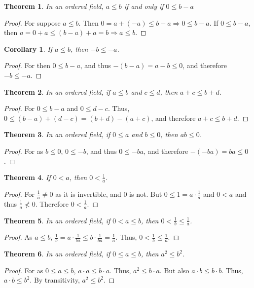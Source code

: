 \documentclass[oneside]{book}
\theoremstyle{mystyle}
\newtheorem{theorem}{Theorem}[section]
\newtheorem{corollary}{Corollary}[section]
\begin{document}
\begin{theorem}
In an ordered field, $a\leq b$ if and only if $0 \leq b-a$
\end{theorem}
\begin{proof}
For suppose $a\leq b$. Then $0=a+(-a)\leq b-a\Rightarrow 0 \leq b-a$. If $0\leq b-a$, then $a=0+a \leq (b-a)+a = b\Rightarrow a\leq b$.
\end{proof}

\begin{corollary}
If $a\leq b$, then $-b\leq -a$.
\end{corollary}
\begin{proof}
For then $0 \leq b-a$, and thus $-(b-a)=a-b\leq 0$, and therefore $-b \leq -a$.
\end{proof}

\begin{theorem}
In an ordered field, if $a\leq b$ and $c\leq d$, then $a+c \leq b+d$.
\end{theorem}
\begin{proof}
For $0\leq b-a$ and $0\leq d-c$. Thus, $0\leq (b-a)+(d-c)= (b+d)-(a+c)$, and therefore $a+c \leq b+d$.
\end{proof}

\begin{theorem}
In an ordered field, if $0\leq a$ and $b\leq 0$, then $ab\leq 0$.
\end{theorem}
\begin{proof}
For as $b\leq 0$, $0\leq -b$, and thus $0\leq -ba$, and therefore $-(-ba) = ba \leq 0$.
\end{proof}

\begin{theorem}
If $0< a$, then $0<\frac{1}{a}$.
\end{theorem}
\begin{proof}
For $\frac{1}{a}\ne 0$ as it is invertible, and $0$ is not. But $0\leq1=a\cdot \frac{1}{a}$ and $0<a$ and thus $\frac{1}{a} \not <0$. Therefore $0<\frac{1}{a}$.
\end{proof}

\begin{theorem}
In an ordered field, if $0<a\leq b$, then $0<\frac{1}{b}\leq\frac{1}{a}$.
\end{theorem}
\begin{proof}
As $a\leq b$, $\frac{1}{b}=a\cdot \frac{1}{ba} \leq b\cdot \frac{1}{ba}=\frac{1}{a}$. Thus, $0< \frac{1}{b}\leq \frac{1}{a}$.
\end{proof}

\begin{theorem}
In an ordered field, if $0 \leq a \leq b$, then $a^2 \leq b^2$.
\end{theorem}
\begin{proof}
For as $0\leq a \leq b$, $a\cdot a \leq b\cdot a$. Thus, $a^2 \leq b \cdot a$. But also $a\cdot b \leq b\cdot b$. Thus, $a\cdot b \leq b^2$. By transitivity, $a^2 \leq b^2$.
\end{proof}
\end{document}
